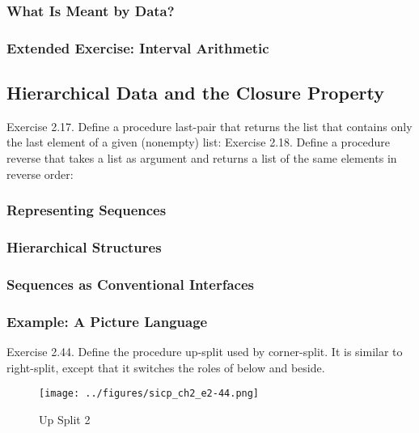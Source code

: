             \subsubsection{What Is Meant by Data?}
            \subsubsection{Extended Exercise: Interval Arithmetic}
        \subsection{Hierarchical Data and the Closure Property}
Exercise 2.17.  Define a procedure last-pair that returns the list that contains only the last element of a given (nonempty) list:
Exercise 2.18.  Define a procedure reverse that takes a list as argument and returns a list of the same elements in reverse order:
            \subsubsection{Representing Sequences}
            \subsubsection{Hierarchical Structures}
            \subsubsection{Sequences as Conventional Interfaces}
            \subsubsection{Example: A Picture Language}
Exercise 2.44.  Define the procedure up-split used by corner-split.  It is similar to right-split, except that it switches the roles of below and beside.

\begin{figure}[H]
\begin{center}
\texttt{[image: ../figures/sicp\_ch2\_e2-44.png]}
\end{center}
\caption{Up Split 2}
\label{fig:up_split_2}
\end{figure}

